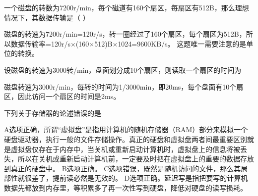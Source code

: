 \question 一个磁盘的转数为7200r/min，每个磁道有160个扇区，每扇区有512B，那么理想情况下，其数据传输是（
）
\par{}
\begin{solution}磁盘的转速为7200r/min=120r/s，转一圈经过了160个扇区，每个扇区为512B，所以数据传输率=120r/s×(160×512)B×1024=9600KB/s。
这题唯一需要注意的是单位的转换。
\end{solution}
\question 设磁盘的转速为3000转/min，盘面划分成10个扇区，则读取一个扇区的时间为
\par{}
\begin{solution}磁盘转速为3000r/min，每转的时间为1/3000min，即20ms，每个盘面有10个扇区，因此访问一个扇区的时间是2ms。
\end{solution}
\question 下列关于存储器的论述错误的是
\par{}
\begin{solution}A选项正确，所谓``虚拟盘''是指用计算机的随机存储器（RAM）部分来模拟一个硬盘驱动器，执行一般的文件存储操作。真正的硬盘和虚拟盘两者间最重要区别就是虚拟盘仅存在于内存中，当关机或重新启动计算机时，虚拟盘上的信息将被丢失，所以在关机或重新启动计算机前，一定要及时把在虚拟盘上的重要的数据存放到真正的硬盘中。
B选项正确。
C选项错误，既然是随机访问的文件，那么其局部性就很差了，提前读必然是无效的。
D选项正确。延迟写是指把要写的计算机数据先都放到内存里，等积累多了再一次性写到硬盘，降低对硬盘的读写损耗。
\end{solution}
